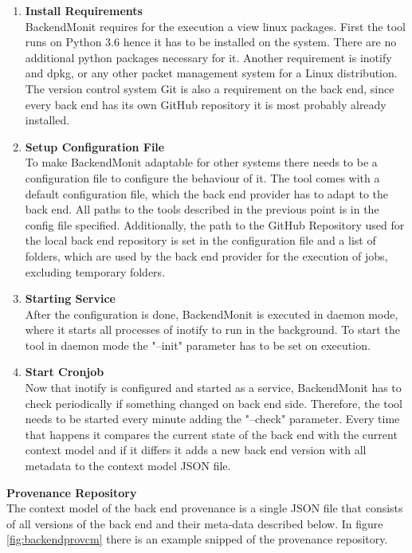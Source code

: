 \documentclass[draft,final]{vutinfth} %
\begin{document}
\begin{enumerate}
	\item \textbf{Install Requirements} \\
	BackendMonit requires for the execution a view linux packages. First the tool runs on Python 3.6 hence it has to be installed on the system. There are no additional python packages necessary for it. Another requirement is inotify and dpkg, or any other packet management system for a Linux distribution. The version control system Git is also a requirement on the back end, since every back end has its own GitHub repository it is most probably already installed. 
	
	\item \textbf{Setup Configuration File} \\
	To make BackendMonit adaptable for other systems there needs to be a configuration file to configure the behaviour of it. The tool comes with a default configuration file, which the back end provider has to adapt to the back end. All paths to the tools described in the previous point is in the config file specified. Additionally, the path to the GitHub Repository used for the local back end repository is set in the configuration file and a list of folders, which are used by the back end provider for the execution of jobs, excluding temporary folders.      
	     
	\item\textbf{Starting Service} \\
	After the configuration is done, BackendMonit is executed in daemon mode, where it starts all processes of inotify to run in the background. To start the tool in daemon mode the "--init" parameter has to be set on execution. 
	
	\item \textbf{Start Cronjob} \\
	Now that inotify is configured and started as a service, BackendMonit has to check periodically if something changed on back end side. Therefore, the tool needs to be started every minute adding the "--check" parameter. Every time that happens it compares the current state of the back end with the current context model and if it differs it adds a new back end version with all metadata to the context model JSON file. 	 
\end{enumerate}

\textbf{Provenance Repository} \\
The context model of the back end provenance is a single JSON file that consists of all versions of the back end and their meta-data described below. In figure \ref{fig:backendprovcm} there is an example snipped of the provenance repository. 
\end{document}
